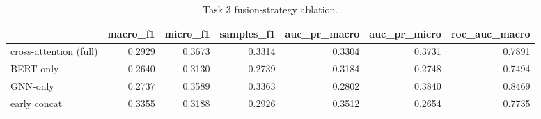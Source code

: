 \begin{table}[t]
\caption{Task 3 fusion-strategy ablation.}
\label{tab:t3abl}
\begin{tabular}{lrrrrrr}
\toprule
 & macro\_f1 & micro\_f1 & samples\_f1 & auc\_pr\_macro & auc\_pr\_micro & roc\_auc\_macro \\
\midrule
cross-attention (full) & 0.2929 & 0.3673 & 0.3314 & 0.3304 & 0.3731 & 0.7891 \\
BERT-only & 0.2640 & 0.3130 & 0.2739 & 0.3184 & 0.2748 & 0.7494 \\
GNN-only & 0.2737 & 0.3589 & 0.3363 & 0.2802 & 0.3840 & 0.8469 \\
early concat & 0.3355 & 0.3188 & 0.2926 & 0.3512 & 0.2654 & 0.7735 \\
\bottomrule
\end{tabular}
\end{table}
